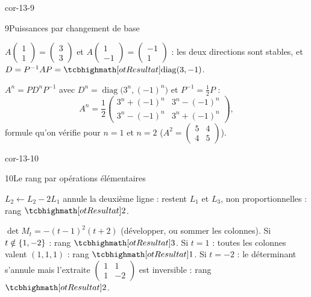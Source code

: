 \begin{blocLivre}{cor-13-9}
\begin{corrige}{9}{Puissances par changement de base}
\begin{questions}
  \item $A\begin{pmatrix}1\\1\end{pmatrix}=\begin{pmatrix}3\\3\end{pmatrix}$
    et $A\begin{pmatrix}1\\-1\end{pmatrix}=\begin{pmatrix}-1\\1\end{pmatrix}$ :
    les deux directions sont stables, et
    $D=P^{-1}AP=\res{\operatorname{diag}(3,-1)}$.
  \item $A^{n}=PD^{n}P^{-1}$ avec $D^{n}=\operatorname{diag}\bigl(3^{n},(-1)^{n}\bigr)$
    et $P^{-1}=\frac12P$ :
    \[
    A^{n}=\frac12\begin{pmatrix}3^{n}+(-1)^{n}&3^{n}-(-1)^{n}\\
    3^{n}-(-1)^{n}&3^{n}+(-1)^{n}\end{pmatrix},
    \]
    formule qu'on vérifie pour $n=1$ et $n=2$ ($A^{2}=\begin{pmatrix}5&4\\4&5\end{pmatrix}$).
\end{questions}
\end{corrige}
\end{blocLivre}

\begin{blocLivre}{cor-13-10}
\begin{corrige}{10}{Le rang par opérations élémentaires}
\begin{questions}
  \item $L_2\leftarrow L_2-2L_1$ annule la deuxième ligne :
    restent $L_1$ et $L_3$, non proportionnelles : rang $\res{2}$.
  \item $\det M_t=-(t-1)^{2}(t+2)$ (développer, ou sommer les colonnes).
    Si $t\notin\left\{1,-2\right\}$ : rang $\res{3}$. Si $t=1$ : toutes les
    colonnes valent $(1,1,1)$ : rang $\res{1}$. Si $t=-2$ : le déterminant
    s'annule mais l'extraite $\begin{pmatrix}1&1\\1&-2\end{pmatrix}$ est
    inversible : rang $\res{2}$.
\end{questions}
\end{corrige}
\end{blocLivre}

